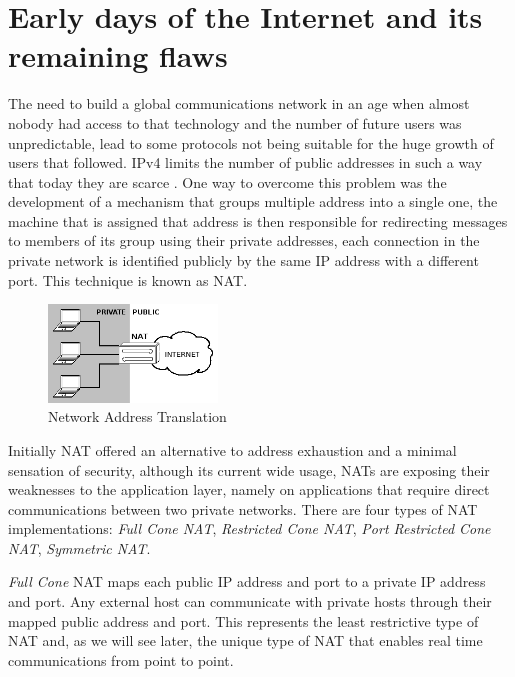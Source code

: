 \section{Early days of the Internet and its remaining flaws}\label{early}

The need to build a global communications network in an age when almost nobody had access to that technology and the number of future users was unpredictable, lead to some protocols not being suitable for the huge growth of users that followed. \ac{IPv4} limits the number of public addresses in such a way that today they are scarce \cite{ipv4}. One way to overcome this problem was the development of a mechanism that groups multiple address into a single one, the machine that is assigned that address is then responsible for redirecting messages to members of its group using their private addresses, each connection in the private network is identified publicly by the same \ac{IP} address with a different port.
This technique is known as \ac{NAT}.

\begin{figure}[H]
	\centering
	\includegraphics[width=0.4\textwidth]{figures/nat.png}
	\caption{Network Address Translation}
\end{figure}

Initially \ac{NAT} offered an alternative to address exhaustion and a minimal sensation of security, although its current wide usage, \ac{NAT}s are exposing their weaknesses to the application layer, {\color{blue}namely on applications that require direct communications between two private networks.}
There are four types of \ac{NAT} implementations\cite{rfc3489}: \emph{Full Cone NAT}, \emph{Restricted Cone NAT}, \emph{Port Restricted Cone NAT}, \emph{Symmetric NAT}.

\emph{Full Cone} \ac{NAT} maps each public \ac{IP} address and port to a private \ac{IP} address and port.
Any external host can communicate with private hosts through their mapped public address and port. This represents the least restrictive type of \ac{NAT} and, as we will see later, the unique type of \ac{NAT} that enables real time communications from point to point.

